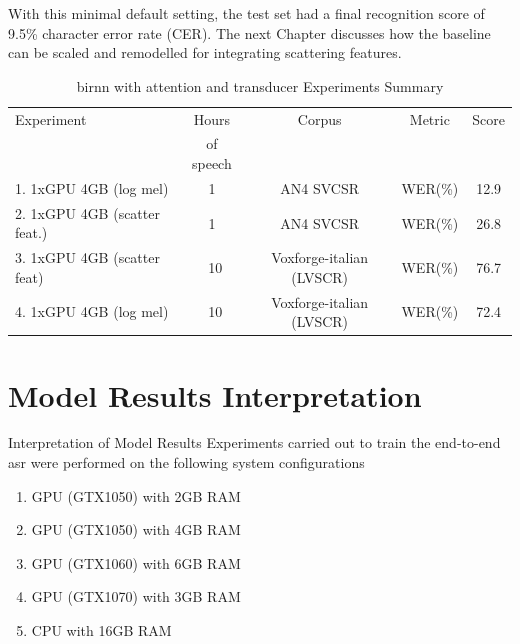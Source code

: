 With this minimal default setting, the test set had a final recognition score of 9.5\% character error rate (CER).  The next Chapter discusses how the baseline can be scaled and remodelled for integrating scattering features.

\begin{table}
  \caption{\acrshort{birnn} with attention and transducer Experiments Summary}
  \label{tab_c6_04_training}
\begin{tabular}{lcccc}
\toprule
Experiment & Hours & Corpus & Metric & Score\\& of speech\\
\midrule
1. 1xGPU 4GB (log mel) & 1 & AN4 SVCSR & WER(\%) & 12.9\\
2. 1xGPU 4GB (scatter feat.) & 1 & AN4 SVCSR & WER(\%) & 26.8 \\
3. 1xGPU 4GB (scatter feat) & ~10 & Voxforge-italian (LVSCR) & WER(\%) & 76.7 \\
4. 1xGPU 4GB (log mel) & ~10 &  Voxforge-italian (LVSCR) & WER(\%) & 72.4\\
\bottomrule
\end{tabular}
\end{table}

\section{Model Results Interpretation}
Interpretation of Model Results
Experiments carried out to train the end-to-end \acrshort{asr} were performed on the following system configurations
\begin{enumerate}
    \item GPU (GTX1050) with 2GB RAM
    \item GPU (GTX1050) with 4GB RAM
    \item GPU (GTX1060) with 6GB RAM
    \item GPU (GTX1070) with 3GB RAM
    \item CPU with 16GB RAM
\end{enumerate}

